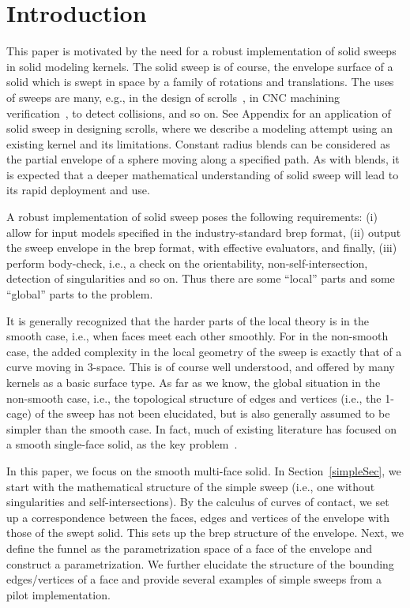 \documentclass{elsart5p}
\begin{document}
\section{Introduction} \label{introSec}
This paper is motivated by the need for a robust implementation of solid sweeps in
solid modeling kernels. The solid sweep is of course, the envelope
surface of a solid which is swept in space by a family of rotations and translations.
The uses of sweeps are many, e.g., in the design of scrolls~\cite{scroll}, 
in CNC machining verification~\cite{completeSweep}, 
to detect collisions, and so on. 
See Appendix for an application of solid sweep in designing scrolls,   
where we describe a modeling attempt using an existing kernel and its limitations.
Constant radius blends can be considered as the partial envelope of a sphere 
moving along a specified path.  As with blends, it is expected 
that a deeper mathematical understanding of solid sweep will lead to its rapid 
deployment and use.


A robust implementation of solid sweep poses the following
requirements: (i) allow for input models specified in the
industry-standard brep format, (ii) output the sweep envelope in the brep
format, with effective evaluators,
and finally, (iii) perform body-check, i.e., a check on the orientability,
non-self-intersection, detection of singularities and so on.
Thus there are some ``local'' parts and some ``global'' parts to the
problem.

It is
generally recognized that the harder parts of the local theory is in the
smooth case,
i.e., when faces meet each other smoothly.
For in the non-smooth case, the added complexity in the 
local geometry of the sweep is exactly that of a curve moving in 3-space.
This
is of course well understood, and offered by many kernels as a basic surface
type. As far as we know, the global situation in the non-smooth case, i.e.,
the topological structure of edges and
vertices (i.e., the 1-cage) of the sweep has not been elucidated, but is
also generally assumed
to be simpler than the smooth case.
In fact, much of existing literature has focused on a smooth single-face
solid, as the key problem~\cite{jacobian, sede, trimming}.



In this paper, we focus on the smooth multi-face
solid. In Section~\ref{simpleSec}, we start with the mathematical
structure of the simple sweep (i.e., one without singularities and
self-intersections). By the calculus of curves of contact, we set up a
correspondence between the faces, edges and vertices of
the envelope with those of the swept solid. This sets up the brep structure
of the envelope. Next, we define the funnel as the parametrization space
of a face of the envelope and construct a parametrization. We further elucidate
the structure of the bounding edges/vertices of a face and provide several examples 
of simple sweeps from a pilot implementation.
\end{document}
